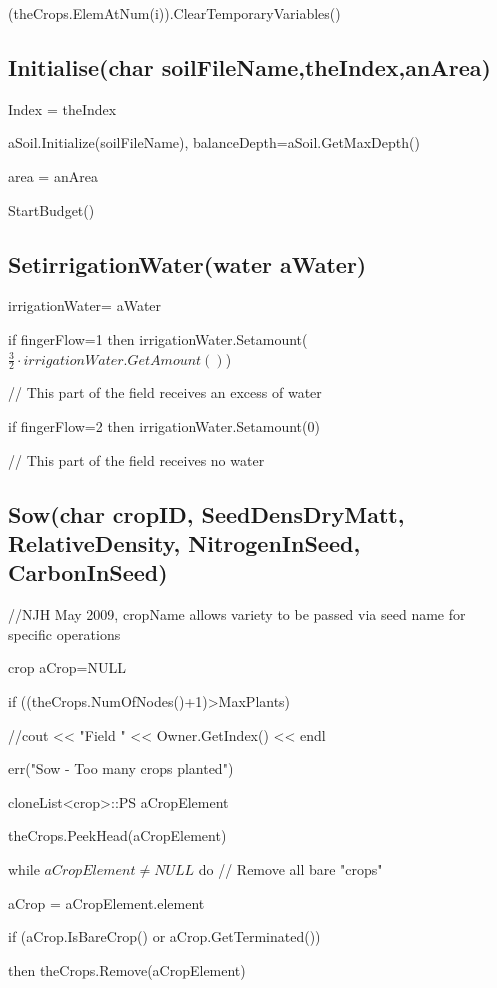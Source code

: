 \documentclass[%
]{scrartcl}
\begin{document}
	 \quad	 (theCrops.ElemAtNum(i)).ClearTemporaryVariables()


\subsection{Initialise(char soilFileName,theIndex,anArea)}	

Index = theIndex

  	aSoil.Initialize(soilFileName),  balanceDepth=aSoil.GetMaxDepth()
   
   area = anArea
   
   StartBudget()


\subsection{SetirrigationWater(water  aWater)
}	irrigationWater=  aWater

   if fingerFlow=1 then
         irrigationWater.Setamount($\tfrac{3}{2} \cdot irrigationWater.GetAmount()$)
				
// This part of the field receives an excess of water
  
 if fingerFlow=2 then
         irrigationWater.Setamount(0)
				
// This part of the field receives no water




\subsection{Sow(char   cropID,   SeedDensDryMatt,  RelativeDensity,  NitrogenInSeed,   CarbonInSeed)
}
//NJH May 2009, cropName allows variety to be passed via seed name for specific operations

   crop   aCrop=NULL

   if ((theCrops.NumOfNodes()+1)>MaxPlants)
  
      \quad  //cout << "Field " << Owner.GetIndex() << endl

     \quad   err("Sow - Too many crops planted")
 
   cloneList<crop>::PS aCropElement

   theCrops.PeekHead(aCropElement)

   while $aCropElement\ne NULL$ do
    // Remove all bare "crops"

   \quad     aCrop = aCropElement.element

 \quad       if (aCrop.IsBareCrop() or aCrop.GetTerminated())

   \quad  \quad then       theCrops.Remove(aCropElement)
\end{document}
